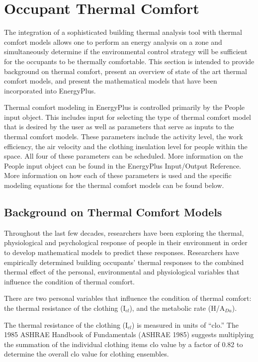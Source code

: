 \section{Occupant Thermal Comfort }\label{occupant-thermal-comfort}

The integration of a sophisticated building thermal analysis tool with thermal comfort models allows one to perform an energy analysis on a zone and simultaneously determine if the environmental control strategy will be sufficient for the occupants to be thermally comfortable. This section is intended to provide background on thermal comfort, present an overview of state of the art thermal comfort models, and present the mathematical models that have been incorporated into EnergyPlus.

Thermal comfort modeling in EnergyPlus is controlled primarily by the People input object. This includes input for selecting the type of thermal comfort model that is desired by the user as well as parameters that serve as inputs to the thermal comfort models. These parameters include the activity level, the work efficiency, the air velocity and the clothing insulation level for people within the space. All four of these parameters can be scheduled. More information on the People input object can be found in the EnergyPlus Input/Output Reference. More information on how each of these parameters is used and the specific modeling equations for the thermal comfort models can be found below.

\subsection{Background on Thermal Comfort Models}\label{background-on-thermal-comfort-models}

Throughout the last few decades, researchers have been exploring the thermal, physiological and psychological response of people in their environment in order to develop mathematical models to predict these responses. Researchers have empirically determined building occupants' thermal responses to the combined thermal effect of the personal, environmental and physiological variables that influence the condition of thermal comfort.

There are two personal variables that influence the condition of thermal comfort: the thermal resistance of the clothing (I\(_{cl}\)), and the metabolic rate (H/A\(_{Du}\)).

The thermal resistance of the clothing (I\(_{cl}\)) is measured in units of ``clo.'' The 1985 ASHRAE Handbook of Fundamentals (ASHRAE 1985) suggests multiplying the summation of the individual clothing items clo value by a factor of 0.82 to determine the overall clo value for clothing ensembles.


